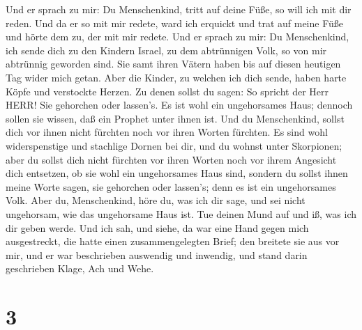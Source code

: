  Und er sprach zu mir: Du Menschenkind, tritt auf deine
Füße, so will ich mit dir reden.  Und da er so mit mir
redete, ward ich erquickt und trat auf meine Füße und hörte dem zu, der
mit mir redete.  Und er sprach zu mir: Du Menschenkind, ich
sende dich zu den Kindern Israel, zu dem abtrünnigen Volk, so von mir
abtrünnig geworden sind. Sie samt ihren Vätern haben bis auf diesen
heutigen Tag wider mich getan.  Aber die Kinder, zu welchen
ich dich sende, haben harte Köpfe und verstockte Herzen. Zu denen sollst
du sagen: So spricht der Herr HERR!  Sie gehorchen oder
lassen's. Es ist wohl ein ungehorsames Haus; dennoch sollen sie wissen,
daß ein Prophet unter ihnen ist.  Und du Menschenkind,
sollst dich vor ihnen nicht fürchten noch vor ihren Worten fürchten. Es
sind wohl widerspenstige und stachlige Dornen bei dir, und du wohnst
unter Skorpionen; aber du sollst dich nicht fürchten vor ihren Worten
noch vor ihrem Angesicht dich entsetzen, ob sie wohl ein ungehorsames
Haus sind,  sondern du sollst ihnen meine Worte sagen, sie
gehorchen oder lassen's; denn es ist ein ungehorsames Volk. 
Aber du, Menschenkind, höre du, was ich dir sage, und sei nicht
ungehorsam, wie das ungehorsame Haus ist. Tue deinen Mund auf und iß,
was ich dir geben werde.  Und ich sah, und siehe, da war
eine Hand gegen mich ausgestreckt, die hatte einen zusammengelegten
Brief;  den breitete sie aus vor mir, und er war
beschrieben auswendig und inwendig, und stand darin geschrieben Klage,
Ach und Wehe.

\hypertarget{section-2}{%
\section{3}\label{section-2}}

